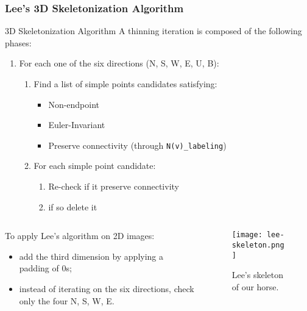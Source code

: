 \begin{frame}
  \frametitle{Lee's 3D Skeletonization Algorithm}
  \begin{block}{3D Skeletonization Algorithm}
    A thinning iteration is composed of the following phases:
    \begin{enumerate}
      \item For each one of the six directions (N, S, W, E, U, B):
            \begin{enumerate}
              \item Find a list of simple points candidates satisfying:
                    \begin{itemize}
                      \item Non-endpoint
                      \item Euler-Invariant
                      \item Preserve connectivity (through \lstinline{N(v)_labeling})
                    \end{itemize}
              \item For each simple point candidate:
                    \begin{enumerate}
                      \item Re-check if it preserve connectivity
                      \item if so delete it
                    \end{enumerate}
            \end{enumerate}
    \end{enumerate}
  \end{block}
  \begin{columns}
    \begin{column}[]{0.6\textwidth}
      \vspace{0.5cm}
      To apply Lee's algorithm on 2D images:
      \begin{itemize}
        \item add the third dimension by applying a padding of 0s;
        \item instead of iterating on the six directions, check only the four N, S, W, E.
      \end{itemize}
    \end{column}
    \begin{column}{0.4\textwidth}
      \begin{figure}
        \texttt{[image: lee-skeleton.png]}
        \caption{Lee's skeleton of our horse.}
      \end{figure}
    \end{column}
  \end{columns}

\end{frame}
